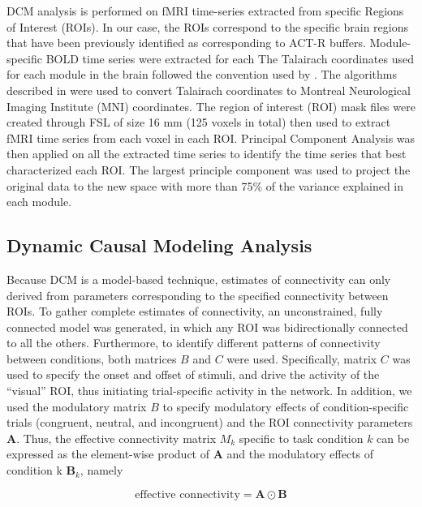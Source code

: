 \documentclass[10pt,letterpaper]{article}
\newcommand{\mat}[1]{\boldsymbol{#1}} %
\begin{document}
DCM analysis is performed on fMRI time-series extracted from specific Regions of Interest (ROIs). In our case, the ROIs correspond to the specific brain regions that have been previously identified as corresponding to ACT-R buffers. Module-specific BOLD time series were extracted for each  The Talairach coordinates used for each module in the brain followed the convention used by \cite{Anderson2008, Borst2017}. The algorithms described in \cite{Lacadie2008} were used to convert Talairach coordinates to Montreal Neurological Imaging Institute (MNI) coordinates. The region of interest (ROI) mask files were created through FSL \cite{Woolrich2009} of size 16 mm (125 voxels in total) then used to extract fMRI time series from each voxel in each ROI. Principal Component Analysis was then applied on all the extracted time series to identify the time series that best characterized each ROI. The largest principle component was used to project the original data to the new space with more than 75\% of the variance explained in each module. 

\subsection{Dynamic Causal Modeling Analysis}

Because DCM is a model-based technique, estimates of connectivity can only derived from parameters corresponding to the specified connectivity between ROIs.  To gather complete estimates of connectivity, an unconstrained, fully connected model was generated, in which any ROI was bidirectionally connected to all the others. Furthermore, to identify different patterns of connectivity between conditions, both matrices $B$ and $C$ were used. Specifically, matrix $C$ was used to specify the onset and offset of stimuli, and drive the activity  of the ``visual'' ROI, thus initiating trial-specific activity in the network. In addition, we used the modulatory matrix $B$ to specify modulatory effects of condition-specific trials (congruent, neutral, and incongruent) and the ROI connectivity parameters $\mat{A}$. Thus, the effective connectivity matrix $M_k$ specific to task condition $k$ can be expressed as the element-wise product of $\mat{A}$ and the modulatory effects of condition k $\mat{B}_k$, namely

\begin{equation}
\text{effective connectivity} = \mat{A} \odot \mat{B}
\label{dcm:trick}
\end{equation}
\end{document}
